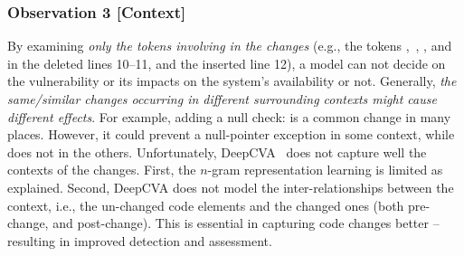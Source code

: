 \subsubsection{Observation 3 [Context]}

By examining {\em only the tokens involving in the changes} (e.g., the
tokens ,~, , and
 in the deleted lines 10--11, and the inserted line 12),
a model can not decide on the vulnerability or its impacts on the
system's availability or not. Generally, {\em the same/similar changes
  occurring in different surrounding contexts might cause different
  effects}.
For example, adding a null check:  is a common
change in many places. However, it could prevent a null-pointer
exception in some context, while does not in the others.
Unfortunately, DeepCVA~\cite{deepCVA-ase21} does not capture well the
contexts of the changes. First, the $n$-gram representation learning
is limited as explained.
%
Second, DeepCVA does not model the inter-relationships between the
context, i.e., the un-changed code elements and the changed ones (both
pre-change, and post-change).  This is essential in capturing code
changes better -- resulting in improved detection and assessment.

